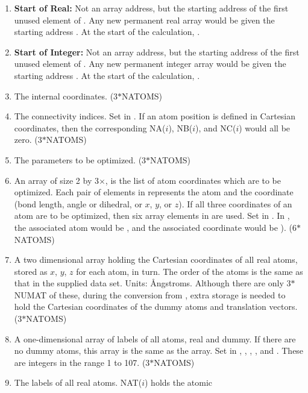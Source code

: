 \begin{enumerate}
\item {\bf Start of Real:}  Not an array address, but the starting address of
the first unused element of .  Any new permanent real array would
be given the starting address . At the start of the calculation,
.
\item {\bf Start of Integer:}  Not an array address, but the starting address
of the first unused element of .  Any new permanent integer array
would be given the starting address . At the start of the
calculation, .
\item {} The internal coordinates. (3$*$NATOMS)
\item {} The connectivity indices.  Set in . If an
atom position is defined in Cartesian coordinates, then the corresponding
NA($i$), NB($i$), and NC($i$) would all be zero. (3$*$NATOMS)
\item {} The parameters to be optimized. (3$*$NATOMS)
\item {} An array of size 2 by 3$\times$,  is
the list of atom coordinates which are to be optimized.  Each pair of elements
in  represents the atom  and the coordinate (bond length, angle or
dihedral, or $x$, $y$, or $z$). If all three coordinates of an atom are to be
optimized, then six array elements in  are used.   Set in
. In  , the associated atom would be
, and the associated coordinate would be ).
(6$*$NATOMS)
\item {} A two dimensional array holding the Cartesian coordinates
of all real atoms, stored as $x$, $y$, $z$ for each atom, in turn.  The order
of the atoms is the same as that in the supplied data set. Units: \AA ngstroms.
Although there are only 3$*$NUMAT of these, during the conversion from
, extra storage is  needed to hold the Cartesian coordinates of the
dummy atoms and translation vectors. (3$*$NATOMS)
\item {} A one-dimensional array of labels of all atoms, real  and
dummy.  If there are no dummy atoms, this array is the same as the  
array.  Set in , , , ,
 and . These are integers in the range 1 to 107.
(3$*$NATOMS)
\item {} The labels of all real atoms. NAT($i$) holds the atomic

\end{enumerate}
